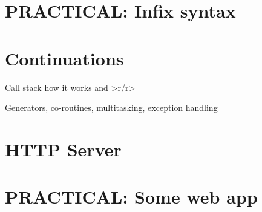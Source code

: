 \documentclass[english]{article}
\begin{document}
\section{PRACTICAL: Infix syntax}


\section{Continuations}

Call stack how it works and >r/r>

Generators, co-routines, multitasking, exception handling


\section{HTTP Server}


\section{PRACTICAL: Some web app}
\end{document}
